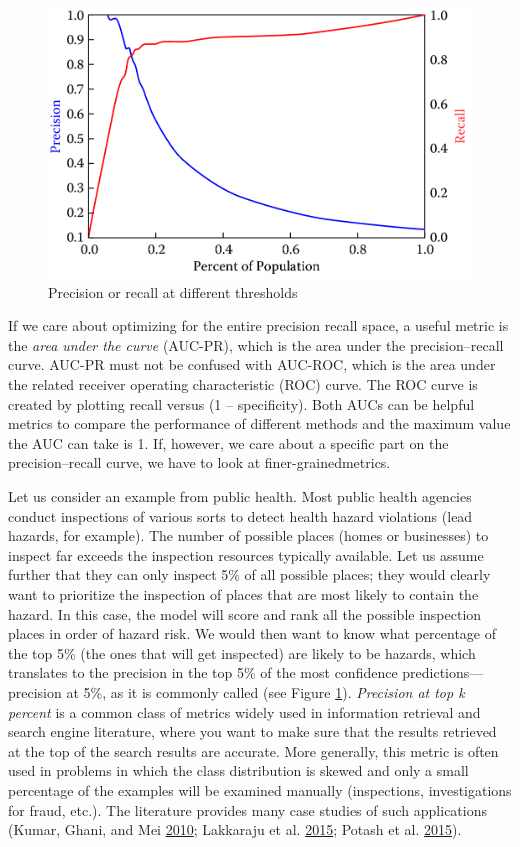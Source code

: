\documentclass[]{krantz}
\begin{document}
\begin{figure}

{\centering \includegraphics[width=0.7\linewidth]{ChapterML/figures/pr2} 

}

\caption{Precision or recall at different thresholds}\label{fig:pr2}
\end{figure}

If we care about optimizing for the entire precision recall space, a
useful metric is the \emph{area under the curve} (AUC-PR), which is the
area under the precision--recall curve. AUC-PR must not be confused with
AUC-ROC, which is the area under the related receiver operating
characteristic (ROC) curve. The ROC curve is created by plotting recall
versus (1 -- specificity). Both AUCs can be helpful metrics to compare
the performance of different methods and the maximum value the AUC can
take is 1. If, however, we care about a specific part on the
precision--recall curve, we have to look at finer-grainedmetrics.

Let us consider an example from public health. Most public health
agencies conduct inspections of various sorts to detect health hazard
violations (lead hazards, for example). The number of possible places
(homes or businesses) to inspect far exceeds the inspection resources
typically available. Let us assume further that they can only inspect
5\% of all possible places; they would clearly want to prioritize the
inspection of places that are most likely to contain the hazard. In this
case, the model will score and rank all the possible inspection places
in order of hazard risk. We would then want to know what percentage of
the top 5\% (the ones that will get inspected) are likely to be hazards,
which translates to the precision in the top 5\% of the most confidence
predictions---precision at 5\%, as it is commonly called (see Figure
\ref{fig:pr2}). \emph{Precision at top k percent} is a common class of
metrics widely used in information retrieval and search engine
literature, where you want to make sure that the results retrieved at
the top of the search results are accurate. More generally, this metric
is often used in problems in which the class distribution is skewed and
only a small percentage of the examples will be examined manually
(inspections, investigations for fraud, etc.). The literature provides
many case studies of such applications (Kumar, Ghani, and Mei
\protect\hyperlink{ref-Kumar2010}{2010}; Lakkaraju et al.
\protect\hyperlink{ref-Lakkaraju2015}{2015}; Potash et al.
\protect\hyperlink{ref-Potash2015}{2015}).
\end{document}
